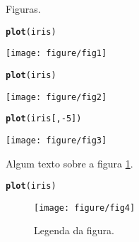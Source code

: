 \documentclass{article}\usepackage[]{graphicx}\usepackage[]{color}
\makeatletter
\def\maxwidth{ %
  \ifdim\Gin@nat@width>\linewidth
    \linewidth
  \else
    \Gin@nat@width
  \fi
}
\newcommand{\hlnum}[1]{\textcolor[rgb]{0.686,0.059,0.569}{#1}}%
\newcommand{\hlopt}[1]{\textcolor[rgb]{0,0,0}{#1}}%
\newcommand{\hlstd}[1]{\textcolor[rgb]{0.345,0.345,0.345}{#1}}%
\newcommand{\hlkwd}[1]{\textcolor[rgb]{0.737,0.353,0.396}{\textbf{#1}}}%
\newenvironment{kframe}{%
 \def\at@end@of@kframe{}%
 \ifinner\ifhmode%
  \def\at@end@of@kframe{\end{minipage}}%
  \begin{minipage}{\columnwidth}%
 \fi\fi%
 \def\FrameCommand##1{\hskip\@totalleftmargin \hskip-\fboxsep
 \colorbox{shadecolor}{##1}\hskip-\fboxsep
     \hskip-\linewidth \hskip-\@totalleftmargin \hskip\columnwidth}%
 \MakeFramed {\advance\hsize-\width
   \@totalleftmargin\z@ \linewidth\hsize
   \@setminipage}}%
 {\par\unskip\endMakeFramed%
 \at@end@of@kframe}
\newenvironment{knitrout}{}{} %
\makeatother
\begin{document}
\newpage

Figuras.

\begin{knitrout}
\color{fgcolor}\begin{kframe}
\begin{alltt}
\hlkwd{plot}\hlstd{(iris)}
\end{alltt}
\end{kframe}
\texttt{[image: figure/fig1]} 

\end{knitrout}


\newpage

\begin{knitrout}
\color{fgcolor}\begin{kframe}
\begin{alltt}
\hlkwd{plot}\hlstd{(iris)}
\end{alltt}
\end{kframe}
\texttt{[image: figure/fig2]} 

\end{knitrout}


\newpage

\begin{knitrout}
\color{fgcolor}\begin{kframe}
\begin{alltt}
\hlkwd{plot}\hlstd{(iris[,} \hlopt{-}\hlnum{5}\hlstd{])}
\end{alltt}
\end{kframe}

{\centering \texttt{[image: figure/fig3]} 

}



\end{knitrout}


\newpage

Algum texto sobre a figura \ref{fig:fig4}.

\begin{knitrout}
\color{fgcolor}\begin{kframe}
\begin{alltt}
\hlkwd{plot}\hlstd{(iris)}
\end{alltt}
\end{kframe}\begin{figure}[!htb]


{\centering \texttt{[image: figure/fig4]} 

}

\caption[Legenda da figura]{Legenda da figura.\label{fig:fig4}}
\end{figure}


\end{knitrout}
\end{document}

